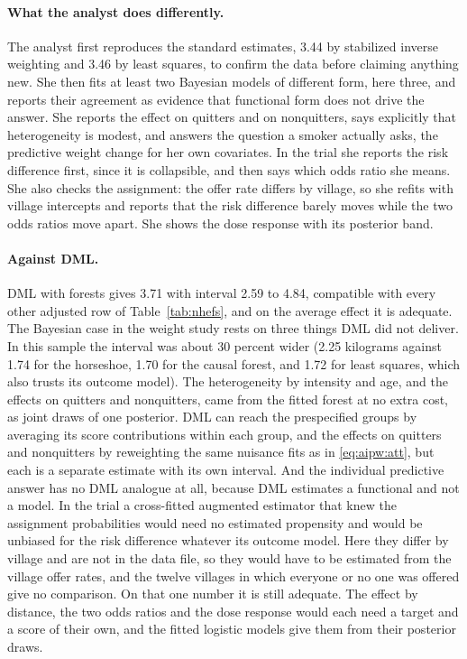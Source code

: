 \paragraph{What the analyst does differently.} The analyst first reproduces the standard estimates, 3.44 by stabilized inverse weighting and 3.46 by least squares, to confirm the data before claiming anything new. She then fits at least two Bayesian models of different form, here three, and reports their agreement as evidence that functional form does not drive the answer. She reports the effect on quitters and on nonquitters, says explicitly that heterogeneity is modest, and answers the question a smoker actually asks, the predictive weight change for her own covariates. In the trial she reports the risk difference first, since it is collapsible, and then says which odds ratio she means. She also checks the assignment: the offer rate differs by village, so she refits with village intercepts and reports that the risk difference barely moves while the two odds ratios move apart. She shows the dose response with its posterior band.

\paragraph{Against DML.} DML with forests gives 3.71 with interval 2.59 to 4.84, compatible with every other adjusted row of Table~\ref{tab:nhefs}, and on the average effect it is adequate. The Bayesian case in the weight study rests on three things DML did not deliver. In this sample the interval was about 30 percent wider (2.25 kilograms against 1.74 for the horseshoe, 1.70 for the causal forest, and 1.72 for least squares, which also trusts its outcome model). The heterogeneity by intensity and age, and the effects on quitters and nonquitters, came from the fitted forest at no extra cost, as joint draws of one posterior. DML can reach the prespecified groups by averaging its score contributions within each group, and the effects on quitters and nonquitters by reweighting the same nuisance fits as in \eqref{eq:aipw:att}, but each is a separate estimate with its own interval. And the individual predictive answer has no DML analogue at all, because DML estimates a functional and not a model. In the trial a cross-fitted augmented estimator that knew the assignment probabilities would need no estimated propensity and would be unbiased for the risk difference whatever its outcome model. Here they differ by village and are not in the data file, so they would have to be estimated from the village offer rates, and the twelve villages in which everyone or no one was offered give no comparison. On that one number it is still adequate. The effect by distance, the two odds ratios and the dose response would each need a target and a score of their own, and the fitted logistic models give them from their posterior draws.

